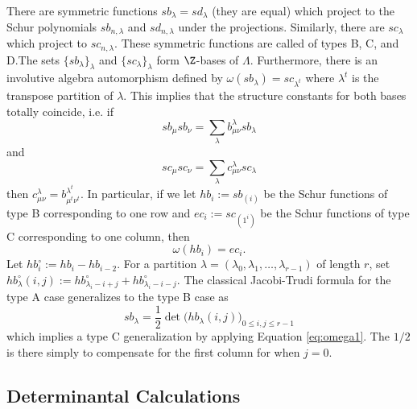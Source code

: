 There are symmetric functions $sb_\lambda=sd_\lambda$ (they are equal) which project to the Schur polynomials $sb_{n,\lambda}$ and $sd_{n, \lambda}$ under the projections. Similarly, there are $sc_\lambda$ which project to $sc_{n, \lambda}$. These symmetric functions are called  of types B, C, and D.The sets $\{sb_\lambda \}_\lambda$ and $\{sc_\lambda \}_\lambda$ form $\Z$-bases of $\Lambda$. Furthermore, there is an involutive algebra automorphism defined by $\omega(sb_\lambda) = sc_{\lambda^t}$ where $\lambda^t$ is the transpose partition of $\lambda$. This implies that the structure constants for both bases totally coincide, i.e. if 
\[
sb_{\mu} sb_{\nu} = \sum_\lambda b_{\mu \nu}^\lambda sb_\lambda
\]
and
\[
sc_{\mu} sc_{\nu} = \sum_\lambda c_{\mu \nu}^{\lambda} sc_{\lambda}
\]
then $c_{\mu \nu}^\lambda = b_{\mu^t \nu^t}^{\lambda^t}$. In particular, if we let $hb_i := sb_{(i)}$ be the Schur functions of type B corresponding to one row and $ec_i := sc_{(1^i)}$ be the Schur functions of type C corresponding to one column, then 
\begin{equation} \label{eq:omega1}
\omega(hb_i) = ec_i.
\end{equation}
Let $hb_i^\circ := hb_i - hb_{i-2}$. For a partition $\lambda=(\lambda_0, \lambda_1, \dots, \lambda_{r-1})$ of length $r$, set $hb_\lambda^\circ(i,j) := hb_{\lambda_i - i + j}^\circ + hb_{\lambda_i - i - j}^\circ$. The classical Jacobi-Trudi formula for the type A case generalizes to the type B case as
\begin{equation} \label{eq:jacobitrudi}
sb_\lambda = \frac{1}{2} \det \big( hb_\lambda(i, j) \big)_{0 \leq i, j \leq r-1}
\end{equation}
which implies a type C generalization by applying Equation \eqref{eq:omega1}. The $1/2$ is there simply to compensate for the first column for when $j=0$. 


\subsection{Determinantal Calculations}

